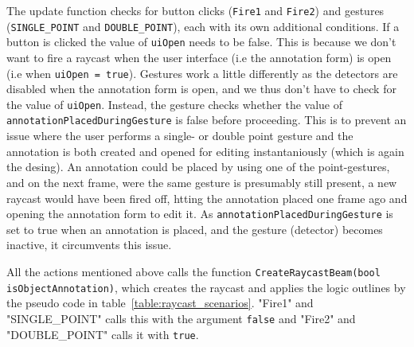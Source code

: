The update function checks for button clicks (\texttt{Fire1} and \texttt{Fire2}) and gestures (\texttt{SINGLE\_POINT} and \texttt{DOUBLE\_POINT}), 
each with its own additional conditions.
If a button is clicked the value of \texttt{uiOpen} needs to be false. This is because we don't want to fire a raycast when the user interface (i.e the annotation form) is 
open (i.e when \texttt{uiOpen = true}). Gestures work a little differently as the detectors are disabled when the annotation form is open, and we thus don't have to check 
for the value of \texttt{uiOpen}.
Instead, the gesture checks whether the value of \texttt{annotationPlacedDuringGesture} is false before proceeding. This is to prevent an issue where the user performs a 
single- or double point gesture and the annotation is both created and opened for editing instantaniously (which is again the desing). An annotation could be placed by 
using one of the point-gestures, and on the next frame, were the same gesture is presumably still present, a new raycast would have been fired off, htting the annotation placed 
one frame ago and opening the annotation form to edit it. As \texttt{annotationPlacedDuringGesture} is set to true when an annotation is placed, and the gesture (detector) 
becomes inactive, it circumvents this issue.

All the actions mentioned above calls the function \texttt{CreateRaycastBeam(bool isObjectAnnotation)}, which creates the raycast and applies the logic outlines by the 
pseudo code in table~\vref{table:raycast_scenarios}. 
"Fire1" and "SINGLE\_POINT" calls this with the argument \texttt{false} and "Fire2" and "DOUBLE\_POINT" calls it with \texttt{true}.

